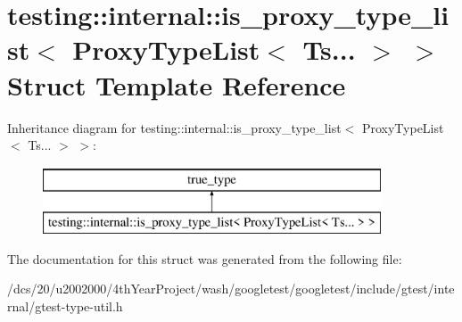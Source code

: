 \hypertarget{structtesting_1_1internal_1_1is__proxy__type__list_3_01ProxyTypeList_3_01Ts_8_8_8_01_4_01_4}{}\section{testing\+:\+:internal\+:\+:is\+\_\+proxy\+\_\+type\+\_\+list$<$ Proxy\+Type\+List$<$ Ts... $>$ $>$ Struct Template Reference}
\label{structtesting_1_1internal_1_1is__proxy__type__list_3_01ProxyTypeList_3_01Ts_8_8_8_01_4_01_4}
Inheritance diagram for testing\+:\+:internal\+:\+:is\+\_\+proxy\+\_\+type\+\_\+list$<$ Proxy\+Type\+List$<$ Ts... $>$ $>$\+:\begin{figure}[H]
\begin{center}
\leavevmode
\includegraphics[height=2.000000cm]{structtesting_1_1internal_1_1is__proxy__type__list_3_01ProxyTypeList_3_01Ts_8_8_8_01_4_01_4}
\end{center}
\end{figure}


The documentation for this struct was generated from the following file\+:\begin{DoxyCompactItemize}
\item 
/dcs/20/u2002000/4th\+Year\+Project/wash/googletest/googletest/include/gtest/internal/gtest-\/type-\/util.\+h\end{DoxyCompactItemize}
